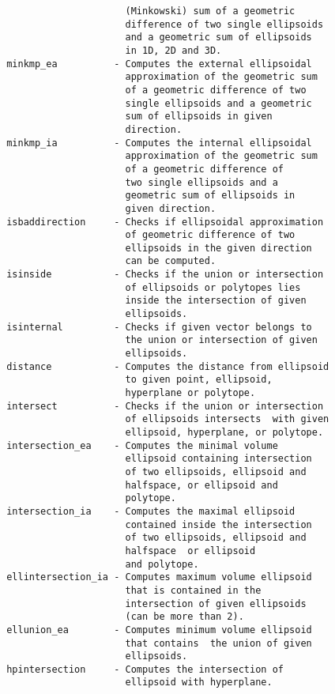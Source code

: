 \begin{enumerate}
\begin{lstlisting}
                      (Minkowski) sum of a geometric
                      difference of two single ellipsoids
                      and a geometric sum of ellipsoids
                      in 1D, 2D and 3D.
 minkmp_ea          - Computes the external ellipsoidal
                      approximation of the geometric sum
                      of a geometric difference of two
                      single ellipsoids and a geometric
                      sum of ellipsoids in given
                      direction.
 minkmp_ia          - Computes the internal ellipsoidal
                      approximation of the geometric sum
                      of a geometric difference of
                      two single ellipsoids and a
                      geometric sum of ellipsoids in
                      given direction.
 isbaddirection     - Checks if ellipsoidal approximation
                      of geometric difference of two
                      ellipsoids in the given direction
                      can be computed.
 isinside           - Checks if the union or intersection
                      of ellipsoids or polytopes lies
                      inside the intersection of given
                      ellipsoids.
 isinternal         - Checks if given vector belongs to
                      the union or intersection of given
                      ellipsoids.
 distance           - Computes the distance from ellipsoid
                      to given point, ellipsoid,
                      hyperplane or polytope.
 intersect          - Checks if the union or intersection
                      of ellipsoids intersects  with given
                      ellipsoid, hyperplane, or polytope.
 intersection_ea    - Computes the minimal volume
                      ellipsoid containing intersection
                      of two ellipsoids, ellipsoid and
                      halfspace, or ellipsoid and
                      polytope.
 intersection_ia    - Computes the maximal ellipsoid
                      contained inside the intersection
                      of two ellipsoids, ellipsoid and
                      halfspace  or ellipsoid
                      and polytope.
 ellintersection_ia - Computes maximum volume ellipsoid
                      that is contained in the
                      intersection of given ellipsoids
                      (can be more than 2).
 ellunion_ea        - Computes minimum volume ellipsoid
                      that contains  the union of given
                      ellipsoids.
 hpintersection     - Computes the intersection of
                      ellipsoid with hyperplane.





\end{lstlisting}
\end{enumerate}
